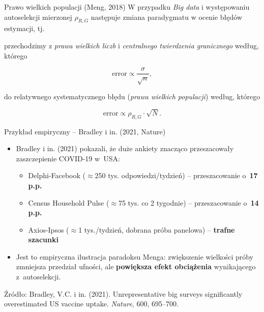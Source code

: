 \documentclass[10pt,ignorenonframetext, aspectratio=169]{beamer}
\begin{document}
\begin{frame}{Prawo wielkich populacji (Meng, 2018)}
    W przypadku \textit{Big data} i występowaniu autoselekcji mierzonej $\rho_{R,G}$ następuje zmiana paradygmatu w ocenie błędów estymacji, tj.
    
    \vspace{0.5cm}
    
    przechodzimy z \textit{prawa wielkich liczb} i \textit{centralnego twierdzenia granicznego} według, którego
    
    
    \begin{equation}
        \boxed{\text{error} \propto \frac{\sigma}{\sqrt{n}},}
    \end{equation}
    
    \vspace{0.5cm}
    
    do relatywnego systematycznego błędu (\textit{prawa wielkich populacji}) według, którego
    
     \begin{equation}
        \boxed{\text{error} \propto \rho_{R,G} \cdot \sqrt{N}.}
    \end{equation}
\end{frame}

\begin{frame}{Przykład empiryczny -- Bradley i in. (2021, Nature)}
    \begin{itemize}
        \justifying
        \item Bradley i in. (2021) pokazali, że duże ankiety znacząco przeszacowały zaszczepienie COVID-19 w~USA:
        \begin{itemize}
            \item Delphi-Facebook ($\approx$250 tys. odpowiedzi/tydzień) -- przeszacowanie o~\textbf{17 p.p.}
            \item Census Household Pulse ($\approx$75 tys. co 2 tygodnie) -- przeszacowanie o~\textbf{14 p.p.}
            \item Axios-Ipsos ($\approx$1 tys./tydzień, dobrana próba panelowa) -- \textbf{trafne szacunki}
        \end{itemize}
        \item Jest to empiryczna ilustracja paradoksu Menga: zwiększenie wielkości próby zmniejsza przedział ufności, ale \textbf{powiększa efekt obciążenia} wynikającego z~autoselekcji.
    \end{itemize}

\small{Źródło: Bradley, V.C. i in. (2021). Unrepresentative big surveys significantly overestimated US vaccine uptake. \textit{Nature}, 600, 695--700.}
\end{frame}
\end{document}

